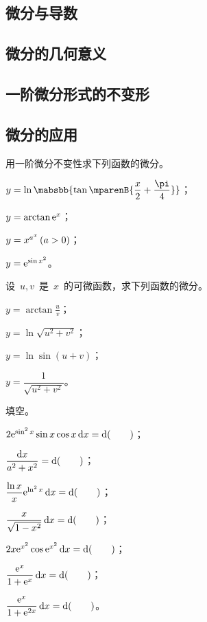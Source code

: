 \subsection{微分与导数}
\subsection{微分的几何意义}
\subsection{一阶微分形式的不变形}
\subsection{微分的应用}
\begin{exercise}
\item 用一阶微分不变性求下列函数的微分。
\begin{exlistcols}
  \item $y=\ln\mabsbb{\tan\mparenB{\dfrac x2+\dfrac\pi4}}$；
  \item $y=\arctan\mathrm e^x$；
  \item $y=x^{a^x}\mcond{a>0}$；
  \item $y=\mathrm e^{\sin x^2}$。
\end{exlistcols}
\item 设~$u,v$~是~$x$~的可微函数，求下列函数的微分。
\begin{exlistcols}
  \item $y=\arctan\frac uv$；
  \item $y=\ln\sqrt{u^2+v^2}$；
  \item $y=\ln\sin(u+v)$；
  \item $y=\dfrac1{\sqrt{u^2+v^2}}$。
\end{exlistcols}
\item 填空。
\begin{exlistcols}
  \item $2\mathrm e^{\sin^2x}\sin x\cos x\mathop{}\negthinspace\mathrm d x=\mathop{}\negthinspace\mathrm d(\qquad)$；
  \item $\dfrac{\mathop{}\negthinspace\mathrm d x}{a^2+x^2}=\mathop{}\negthinspace\mathrm d(\qquad)$；
  \item $\dfrac{\ln x}x\mathrm e^{\ln^2x}\mathop{}\negthinspace\mathrm d x=\mathop{}\negthinspace\mathrm d(\qquad)$；
  \item $\dfrac x{\sqrt{1-x^2}}\mathop{}\negthinspace\mathrm d x=\mathop{}\negthinspace\mathrm d(\qquad)$；
  \item $2x\mathrm e^{x^2}\cos\mathrm e^{x^2}\mathop{}\negthinspace\mathrm d x=\mathop{}\negthinspace\mathrm d(\qquad)$；
  \item $\dfrac{\mathrm e^x}{1+\mathrm e^x}\mathop{}\negthinspace\mathrm d x=\mathop{}\negthinspace\mathrm d(\qquad)$；
  \item $\dfrac{\mathrm e^x}{1+\mathrm e^{2x}}\mathop{}\negthinspace\mathrm d x=\mathop{}\negthinspace\mathrm d(\qquad)$。
\end{exlistcols}

\end{exercise}
